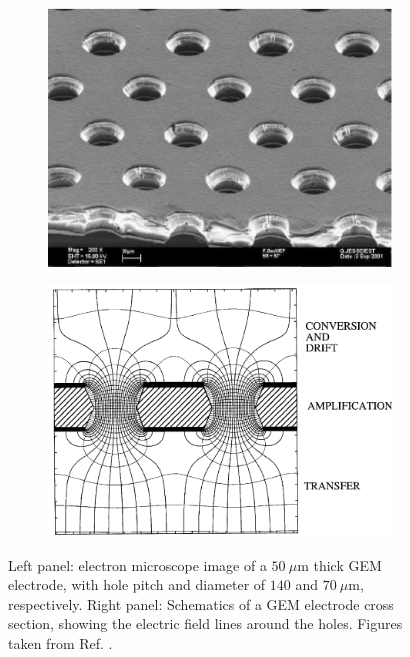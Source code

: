 \begin{figure}[t]
	\begin{subfigure}{0.49\textwidth}
		\centering
		\includegraphics[width=.90\linewidth]{Images/ND-GAr/GEM_photo.jpg}
	\end{subfigure}
	\begin{subfigure}{0.49\textwidth}
		\centering
		\includegraphics[width=.90\linewidth]{Images//ND-GAr/GEM_diagram.pdf}
	\end{subfigure}
	\caption[Electron microscope image and schematic diagram of a GEM electrode.]{Left panel: electron microscope image of a $50~\mu\mathrm{m}$ thick GEM electrode, with hole pitch and diameter of $140$ and $70~\mu\mathrm{m}$, respectively. Right panel: Schematics of a GEM electrode cross section, showing the electric field lines around the holes. Figures taken from Ref. \cite{Sauli2016}.}
	\label{fig:gem}
\end{figure}

